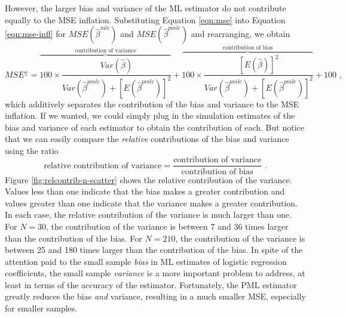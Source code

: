 \documentclass[12pt]{article}
\begin{document}
However, the larger bias and variance of the ML estimator do not contribute equally to the MSE inflation.
Substituting Equation \ref{eqn:mse} into Equation \ref{eqn:mse-infl} for $MSE(\hat{\beta}^{mle})$ and $MSE(\hat{\beta}^{pmle})$ and rearranging, we obtain
\begin{equation}
MSE^\Uparrow = \overbrace{100 \times \dfrac{Var(\hat{\beta})}{Var(\hat{\beta}^{pmle}) + [E(\hat{\beta}^{pmle})]^2}}^{\text{contribution of variance}} + \overbrace{100 \times \dfrac{[E(\hat{\beta})]^2}{Var(\hat{\beta}^{pmle}) + [E(\hat{\beta}^{pmle})]^2}}^{\text{contribution of bias}}  + 100 \text{ ,} \nonumber
\end{equation}
\noindent which additively separates the contribution of the bias and variance to the MSE inflation.
If we wanted, we could simply plug in the simulation estimates of the bias and variance of each estimator to obtain the contribution of each.
But notice that we can easily compare the \textit{relative} contributions of the bias and variance using the ratio
\begin{equation}\label{eqn:rel-contrib}
\text{relative contribution of variance} = \dfrac{\text{contribution of variance}}{\text{contribution of bias}} \text{ .}
\end{equation}
\noindent Figure \ref{fig:relcontrib-n-scatter} shows the relative contribution of the variance.
Values less than one indicate that the bias makes a greater contribution and values greater than one indicate that the variance makes a greater contribution.
In each case, the relative contribution of the variance is much larger than one.
For $N = 30$, the contribution of the variance is between 7 and 36 times larger than the contribution of the bias.
For $N = 210$, the contribution of the variance is between 25 and 180 times larger than the contribution of the bias.
In spite of the attention paid to the small sample \textit{bias} in ML estimates of logistic regression coefficients, the small sample \textit{variance} is a more important problem to address, at least in terms of the accuracy of the estimator.
Fortunately, the PML estimator greatly reduces the bias \textit{and} variance, resulting in a much smaller MSE, especially for smaller samples.
\end{document}
